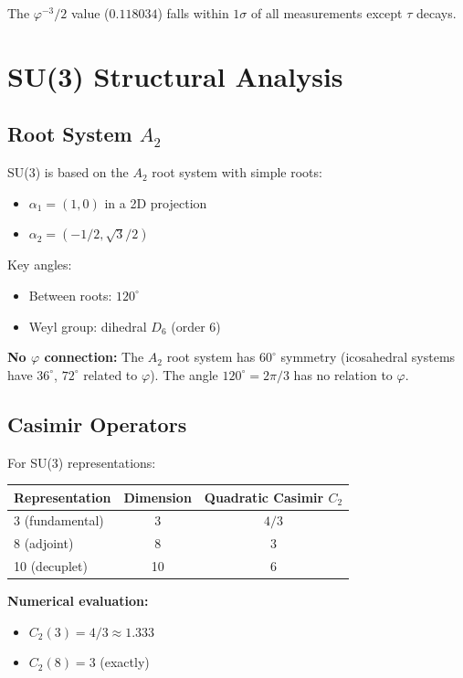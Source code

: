 \documentclass{article}
\begin{document}
The $\varphi^{-3}/2$ value ($0.118034$) falls within $1\sigma$ of all measurements except $\tau$ decays.

\section{SU(3) Structural Analysis}

\subsection{Root System $A_2$}

SU(3) is based on the $A_2$ root system with simple roots:
\begin{itemize}
\item $\alpha_1 = (1, 0)$ in a 2D projection
\item $\alpha_2 = (-1/2, \sqrt{3}/2)$
\end{itemize}

Key angles:
\begin{itemize}
\item Between roots: $120^\circ$
\item Weyl group: dihedral $D_6$ (order 6)
\end{itemize}

\textbf{No $\varphi$ connection:} The $A_2$ root system has $60^\circ$ symmetry (icosahedral systems have $36^\circ$, $72^\circ$ related to $\varphi$). The angle $120^\circ = 2\pi/3$ has no relation to $\varphi$.

\subsection{Casimir Operators}

For SU(3) representations:

\begin{table}[h]
\centering
\begin{tabular}{lcc}
\toprule
Representation & Dimension & Quadratic Casimir $C_2$ \\
\midrule
3 (fundamental) & 3 & $4/3$ \\
8 (adjoint) & 8 & $3$ \\
10 (decuplet) & 10 & $6$ \\
\bottomrule
\end{tabular}
\end{table}

\textbf{Numerical evaluation:}
\begin{itemize}
\item $C_2(3) = 4/3 \approx 1.333$
\item $C_2(8) = 3$ (exactly)
\end{itemize}
\end{document}
